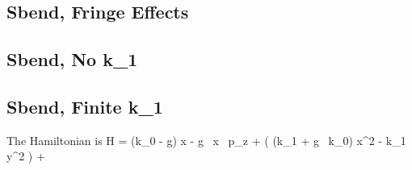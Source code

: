 \documentclass{book}
\begin{document}
\subsection{Sbend, Fringe Effects}


\subsection{Sbend, No k\_1}



\subsection{Sbend, Finite k\_1}

The Hamiltonian is
\Begineq
  H = (k_0 - g) x - g \, x \, p_z + 
  \left( (k_1 + g \, k_0) x^2 - k_1 \, y^2 \right) +
\Endeq
\end{document}
